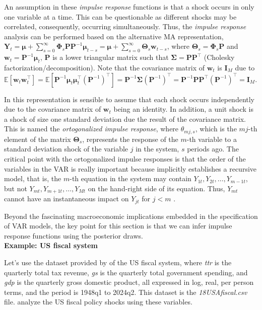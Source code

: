 An assumption in these \textit{impulse response} functions is that a shock occurs in only one variable at a time. This can be questionable as different shocks may be correlated, consequently, occurring simultaneously. Thus, the \textit{impulse response} analysis can be performed based on the alternative MA representation, $\bm{Y}_t=\bm{\mu} + \sum_{s=0}^{\infty}\bm{\Phi}_s\bm{P}\bm{P}^{-1}\bm{\mu}_{t-s}=\bm{\mu} + \sum_{s=0}^{\infty}\bm{\Theta}_s\bm{w}_{t-s}$, where $\bm{\Theta}_s=\bm{\Phi}_s\bm{P}$ and $\bm{w}_{t}=\bm{P}^{-1}\bm{\mu}_{t}$, $\bm{P}$ is a lower triangular matrix such that $\bm{\Sigma}=\bm{P}\bm{P}^{\top}$ (Cholesky factorization/decomposition). Note that the covariance matrix of $\bm{w}_t$ is $\bm{I}_M$ due to $\mathbb{E}[\bm{w}_t\bm{w}_t^{\top}]=\mathbb{E}[\bm{P}^{-1}\bm{\mu}_{t}\bm{\mu}_t^{\top}(\bm{P}^{-1})^{\top}]=\bm{P}^{-1}\bm{\Sigma}(\bm{P}^{-1})^{\top}=\bm{P}^{-1}\bm{P}\bm{P}^{\top}(\bm{P}^{-1})^{\top}=\bm{I}_M$. 

In this representation is sensible to assume that each shock occurs independently due to the covariance matrix of $\bm{w}_t$ being an identity. In addition, a unit shock is a shock of size one standard deviation due the result of the covariance matrix. This is named the \textit{ortogonalized impulse response}, where $\theta_{mj,s}$, which is the $mj$-th element of the matrix $\bm{\Theta}_s$, represents the response of the $m$-th variable to a standard deviation shock of the variable $j$ in the system, $s$ periods ago. The critical point with the ortogonalized impulse responses is that the order of the variables in the VAR is really important because implicitly establishes a recursive model, that is, the $m$-th equation in the system may contain $Y_{1t}, Y_{2t}, \dots, Y_{m-1t}$, but not $Y_{mt}, Y_{m+1t}, \dots, Y_{Mt}$ on the hand-right side of its equation. Thus, $Y_{mt}$ cannot have an instantaneous impact on $Y_{jt}$ for $j<m$ \cite[Chap.~2]{helmut2005new}.

Beyond the fascinating macroeconomic implications embedded in the specification of VAR models, the key point for this section is that we can infer impulse response functions using the posterior draws.\\

\textbf{Example: US fiscal system}

Let's use the dataset provided by \cite{Tomasz2024} of the US fiscal system, where \textit{ttr} is the quarterly total tax revenue, \textit{gs} is the quarterly total government spending, and \textit{gdp} is the quarterly gross domestic product, all expressed in log, real, per person terms, and the period is 1948q1 to 2024q2. This dataset is the \textit{18USAfiscal.csv} file. \cite{mertens2014reconciliation} analyze the US fiscal policy shocks using these variables.

